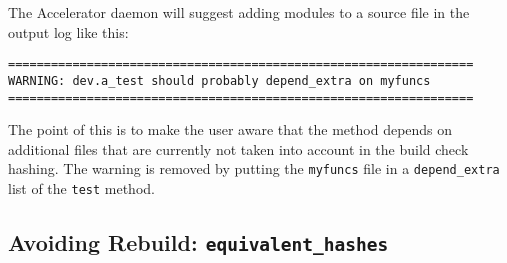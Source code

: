 The Accelerator daemon will suggest adding modules to a source file in
the output log like this:
\begin{snugshade}
\begin{verbatim}
=================================================================
WARNING: dev.a_test should probably depend_extra on myfuncs
=================================================================
\end{verbatim}
\end{snugshade}
\noindent The point of this is to make the user aware that the method
depends on additional files that are currently not taken into account
in the build check hashing.  The warning is removed by putting the
\texttt{myfuncs} file in a \texttt{depend\_extra} list of the
\texttt{test} method.


\subsection{Avoiding Rebuild: \texttt{equivalent\_hashes}}
\label{sec:equivalent_hashes}

